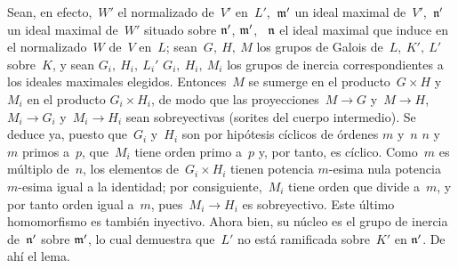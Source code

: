 Sean, en efecto,~$W'$ el normalizado de~$V'$ en~$L'$,~$\mathfrak{m'}$ un ideal
maximal de~$V'$,~$\mathfrak{n'}$ un ideal maximal de~$W'$ situado sobre
{$\mathfrak{n'}$,}
{$\mathfrak{m'}$,}
~$\mathfrak{n}$ el ideal maximal que induce en el normalizado~$W$ de~$V$ en~$L$;
sean~$G,\ H,\ M$ los grupos de Galois de~$L,\ K',\ L'$ sobre~$K$, y sean
{$G_i,\ H_i,\ L_i'$}
{$G_i,\ H_i,\ M_i$}
los grupos de inercia correspondientes a los ideales maximales elegidos.
Entonces~$M$ se sumerge en el producto~$G\times H$ y~$M_i$ en el producto
$G_i\times H_i$, de modo que las proyecciones~$M\to G$ y~$M\to H$,
$M_i\to G_i$
y~$M_i\to H_i$ sean sobreyectivas (sorites del cuerpo intermedio). Se deduce
ya, puesto que~$G_i$ y~$H_i$ son por hipótesis cíclicos de órdenes
{$m$ y~$n$}
{$n$ y~$m$}
primos a~$p$, que~$M_i$ tiene orden primo a~$p$ y, por tanto, es cíclico.
Como~$m$ es múltiplo de~$n$, los elementos de~$G_i\times H_i$ tienen
{potencia $m$-esima nula}
{potencia $m$-esima igual a la identidad};
por consiguiente,~$M_i$ tiene orden que divide a~$m$, y por tanto orden igual
a~$m$, pues~$M_i\to H_i$ es sobreyectivo. Este último homomorfismo es también
inyectivo. Ahora bien, su núcleo es el grupo de inercia de~$\mathfrak{n'}$ sobre
$\mathfrak{m'}$, lo cual demuestra que~$L'$ no está ramificada sobre~$K'$ en
$\mathfrak{n'}$. De ahí el lema.
